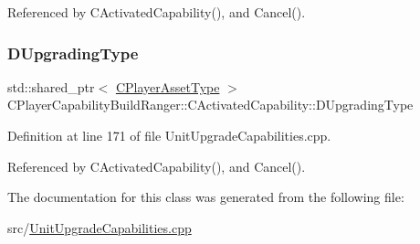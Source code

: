 Referenced by C\+Activated\+Capability(), and Cancel().

\hypertarget{classCPlayerCapabilityBuildRanger_1_1CActivatedCapability_a86cf7894dce398e7c5f4642e57e31682}{}\label{classCPlayerCapabilityBuildRanger_1_1CActivatedCapability_a86cf7894dce398e7c5f4642e57e31682} 
\subsubsection{\texorpdfstring{D\+Upgrading\+Type}{DUpgradingType}}
{\footnotesize\ttfamily std\+::shared\+\_\+ptr$<$ \hyperlink{classCPlayerAssetType}{C\+Player\+Asset\+Type} $>$ C\+Player\+Capability\+Build\+Ranger\+::\+C\+Activated\+Capability\+::\+D\+Upgrading\+Type\hspace{0.3cm}{\ttfamily [protected]}}



Definition at line 171 of file Unit\+Upgrade\+Capabilities.\+cpp.



Referenced by C\+Activated\+Capability(), and Cancel().



The documentation for this class was generated from the following file\+:\begin{DoxyCompactItemize}
\item 
src/\hyperlink{UnitUpgradeCapabilities_8cpp}{Unit\+Upgrade\+Capabilities.\+cpp}\end{DoxyCompactItemize}
